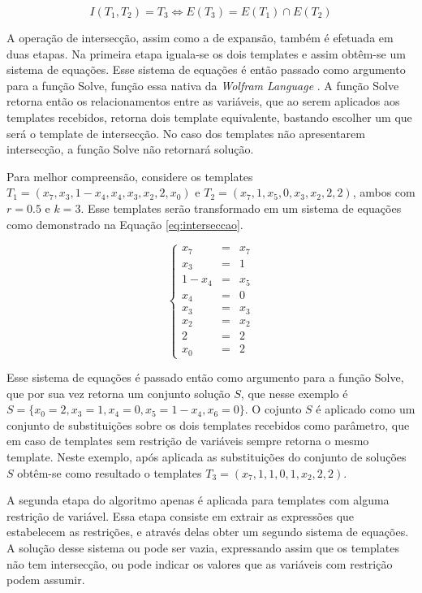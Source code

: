 \documentclass[12pt,a4paper]{article}
\begin{document}
	\begin{equation}
	I(T_1,T_2)=T_3 \Leftrightarrow E(T_3) = E(T_1) \cap E(T_2)
	\end{equation}

	A operação de intersecção, assim como a de expansão, também é efetuada em duas etapas. Na primeira etapa iguala-se os dois templates e assim obtêm-se um sistema de equações. Esse sistema de equações é então passado como argumento para a função Solve, função essa nativa da \textit{Wolfram Language} \cite{woframMathematica10}. A função Solve retorna então os relacionamentos entre as variáveis, que ao serem aplicados aos templates recebidos, retorna dois template equivalente, bastando escolher um que será o template de intersecção. No caso dos templates não apresentarem intersecção, a função Solve não retornará solução.

	Para melhor compreensão, considere os templates $T_1 = (x_7,x_3,1-x_4,x_4,x_3,x_2,2,x_0)$ e $T_2 = (x_7,1,x_5,0,x_3,x_2,2,2)$, ambos com $r=0.5$ e $k=3$. Esse templates serão transformado em um sistema de equações como demonstrado na Equação \ref{eq:interseccao}.

	\begin{equation}
	\left\{\begin{matrix}
	x_7   & = & x_7 \\ 
	x_3   & = & 1 \\ 
	1-x_4 & = & x_5    \\ 
	x_4   & = & 0    \\ 
	x_3   & = & x_3    \\ 
	x_2   & = & x_2   \\ 
	2     & = & 2   \\ 
	x_0   & = & 2
	\end{matrix}\right.
	\label{eq:interseccao}
	\end{equation}

	Esse sistema de equações é passado então como argumento para a função Solve, que por sua vez retorna um conjunto solução $S$, que nesse exemplo é $S = \{x_0 = 2, x_3 = 1, x_4 = 0, x_5 = 1 - x_4, x_6 = 0\}$. O cojunto $S$ é aplicado como um conjunto de substituições sobre os dois templates recebidos como parâmetro, que em caso de templates sem restrição de variáveis sempre retorna o mesmo template. Neste exemplo, após aplicada as substituições do conjunto de soluções $S$ obtêm-se como resultado o templates $T_3 = (x_7, 1, 1, 0, 1, x_2, 2, 2)$.

	A segunda etapa do algoritmo apenas é aplicada para templates com alguma restrição de variável. Essa etapa consiste em extrair as expressões que estabelecem as restrições, e através delas obter um segundo sistema de equações. A solução desse sistema ou pode ser vazia, expressando assim que os templates não tem intersecção, ou pode indicar os valores que as variáveis com restrição podem assumir.
\end{document}
